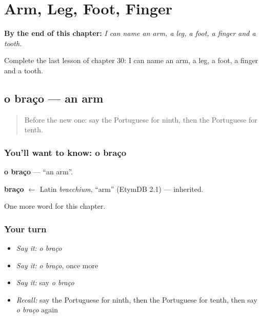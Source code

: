 
\chapter{Arm, Leg, Foot, Finger}
\label{ch:pt-arm-leg-foot-finger}

\begin{chapteropening}
\textbf{By the end of this chapter:} \emph{I can name an arm, a leg, a foot, a finger and a tooth.}

Complete the last lesson of chapter 30: I can name an arm, a leg, a foot, a finger and a tooth.
\end{chapteropening}

\section[o braço]{o braço — an arm}

\label{lesson:PT-C30-braco}



\begin{quote}
Before the new one: say the Portuguese for ninth, then the Portuguese for tenth.
\end{quote}

\subsection*{You'll want to know: o braço}
\textbf{o braço} — \textquotedblleft{}an arm\textquotedblright{}.

\begin{cousinweb}
\textbf{braço} $\leftarrow$ Latin \emph{bracchium}, \textquotedblleft{}arm\textquotedblright{} (EtymDB 2.1) — inherited.
\end{cousinweb}

\begin{grammarlens}[title={What you've built}]
One more word for this chapter.
\end{grammarlens}

\subsection*{Your turn}
\begin{itemize}
\raggedright
  \item \emph{Say it:} \emph{o braço}
  \item \emph{Say it:} \emph{o braço}, once more
  \item \emph{Say it:} say \emph{o braço}
  \item \emph{Recall:} say the Portuguese for ninth, then the Portuguese for tenth, then say \emph{o braço} again
\end{itemize}

